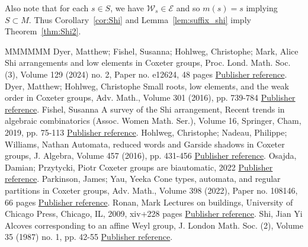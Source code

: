 \documentclass[11pt]{article}
\theoremstyle{definition}
\numberwithin{equation}{section}
\begin{document}
Also note that for each $s\in S$, we have $\mathcal W_s\in \mathcal E$ and so $m(s)=s$ implying $S\subset M$.
Thus Corollary~\ref{cor:Shi} and Lemma~\ref{lem:suffix_shi} imply Theorem~\ref{thm:Shi2}.
\begin{thebibliography}{MMMMMM}
 Dyer, Matthew; Fishel, Susanna; Hohlweg, Christophe; Mark, Alice Shi arrangements and low elements in Coxeter groups, Proc. Lond. Math. Soc. (3), Volume 129 (2024) no. 2, Paper no. e12624, 48 pages \href{https://alco.centre-mersenne.org/articles/10.5802/alco.387/#DHFM}{Publisher reference}.
 Dyer, Matthew; Hohlweg, Christophe Small roots, low elements, and the weak order in Coxeter groups, Adv. Math., Volume 301 (2016), pp. 739-784 \href{https://alco.centre-mersenne.org/articles/10.5802/alco.387/#DH}{Publisher reference}.
 Fishel, Susanna A survey of the Shi arrangement, Recent trends in algebraic combinatorics (Assoc. Women Math. Ser.), Volume 16, Springer, Cham, 2019, pp. 75-113 \href{https://alco.centre-mersenne.org/articles/10.5802/alco.387/#MR3969572}{Publisher reference}.
 Hohlweg, Christophe; Nadeau, Philippe; Williams, Nathan Automata, reduced words and Garside shadows in Coxeter groups, J. Algebra, Volume 457 (2016), pp. 431-456 \href{https://alco.centre-mersenne.org/articles/10.5802/alco.387/#HNW}{Publisher reference}.
 Osajda, Damian; Przytycki, Piotr Coxeter groups are biautomatic, 2022 \href{https://alco.centre-mersenne.org/articles/10.5802/alco.387/#OP}{Publisher reference}.
 Parkinson, James; Yau, Yeeka Cone types, automata, and regular partitions in Coxeter groups, Adv. Math., Volume 398 (2022), Paper no. 108146, 66 pages \href{https://alco.centre-mersenne.org/articles/10.5802/alco.387/#Parkinson-Yau_2022}{Publisher reference}.
 Ronan, Mark Lectures on buildings, University of Chicago Press, Chicago, IL, 2009, xiv+228 pages \href{https://alco.centre-mersenne.org/articles/10.5802/alco.387/#Ronan_2009}{Publisher reference}.
 Shi, Jian Yi Alcoves corresponding to an affine Weyl group, J. London Math. Soc. (2), Volume 35 (1987) no. 1, pp. 42-55 \href{https://alco.centre-mersenne.org/articles/10.5802/alco.387/#Shi_1987}{Publisher reference}.
\end{thebibliography}
\end{document}
